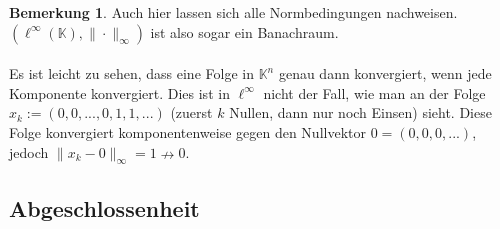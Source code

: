 \documentclass[10pt,a4paper]{article}
\theoremstyle{plain}
\theoremstyle{definition}
\theoremstyle{nonumberplain}
\newtheorem{bemerkung}{Bemerkung}
\newenvironment{bem}{\begin{bemerkung}}{\end{bemerkung}}
\newcommand{\K}{\mathbb{K}}
\begin{document}
\begin{bem}
Auch hier lassen sich alle Normbedingungen nachweisen. $(\ell^\infty(\K), \|\cdot\|_\infty)$ ist also sogar ein Banachraum.\\ \\ Es ist leicht zu sehen, dass eine Folge in $\K^n$ genau dann konvergiert, wenn jede Komponente konvergiert. Dies ist in $\ell^\infty$ nicht der Fall, wie man an der Folge $x_k := (0, 0, ..., 0, 1, 1, ...)$ (zuerst $ k$ Nullen, dann nur noch Einsen) sieht. Diese Folge konvergiert komponentenweise gegen den Nullvektor $0 = (0, 0, 0, . . .)$, jedoch $ \|x_k - 0\|_\infty = 1 \nrightarrow 0$.
\end{bem}
\newpage
\subsection{Abgeschlossenheit}
\end{document}
